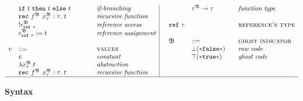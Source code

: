 \begin{figure}[H]
\begin{adjustwidth}{-6em}{-4em}
\begin{displaymath}
\begin{array}{ll@{\hspace*{-0.1cm}}
							 l@{\hspace*{1.5cm} }
							 l|@{\hspace*{0.5cm}}
							 llll}
  & \glif
  & & \textit{if-branching}  &  
  &     \tau^{\mf{B}}  \rightarrow \tau  
  & & \textit{function type} \\  
   		 								      								   
  &	\glrec
  & &  \textit{recursive function}
  & & & & \\
   	   		
   	   								      								   
  &  	\glread
  & &  \textit{reference access} &
  \mathtt{ref}~\tau  &
	& & \textsc{reference's type}  \\      					
 	   
	&  	\glwrite 
	& &  \textit{reference assignment} & \\
	
	& & & & \mf{B} & ::= 
  & & \textsc{ghost indicator} \\
	
	{v} & ::= & & \textsc{values} &
	& \bot \mathtt{(* false *)} 
  & & \textit{raw code} \\ 
	
	
	&   \texttt{c}
  & & \textit{constant} & 
  & \top \mathtt{(* true *)} 
  & & \textit{ghost code} \\ 
	
  &   \glabst
  & & \textit{abstraction} &	\\
	
	&   \glrec
  & & \textit{recursive function} &	\\
	
 \hline						   
  \end{array} 
\end{displaymath} 
\caption{ \textbf{\gml Syntax} \hfill}
\end{adjustwidth}
\end{figure}
%
%
%

